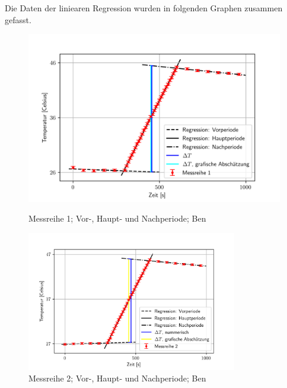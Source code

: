 \documentclass[bibliography=totocnumbered]{scrartcl}
\begin{document}
	Die Daten der liniearen Regression wurden in folgenden Graphen zusammen gefasst.
	
	\begin{figure}[ht!]
		\centering
		\begin{minipage}[ht!]{0.45\linewidth}
			\centering
			\includegraphics[width=\textwidth]{fotos/gpr1/M1_T1.png}
			\caption[Messreihe 1.1]{Messreihe 1; Vor-, Haupt- und Nachperiode; Ben }
			\label{Abb: M1 Ben}
		\end{minipage}
		\hfill
		\begin{minipage}[ht!]{0.45\linewidth}
			\centering
			\includegraphics[width=260pt]{fotos/gpr1/M2_T1.png}
			\caption[Messreihe 2.1]{Messreihe 2; Vor-, Haupt- und Nachperiode; Ben}
			\label{Abb: M2 Ben}
		\end{minipage}
	\end{figure}
\end{document}
